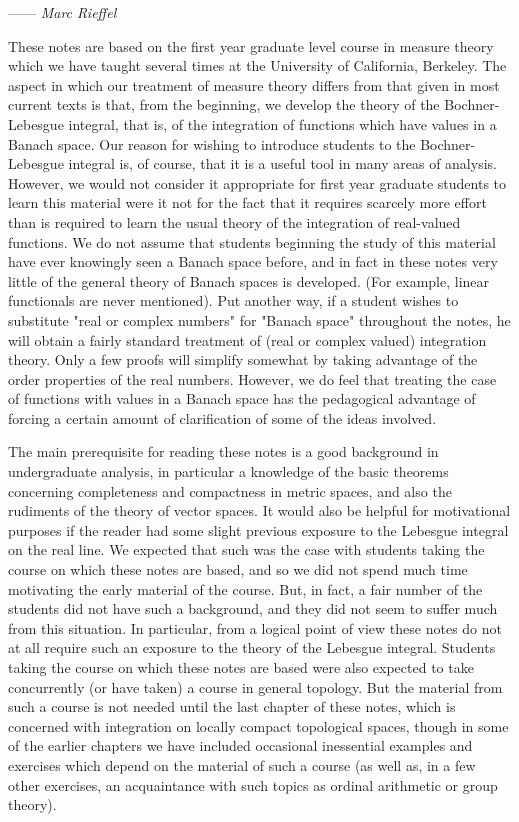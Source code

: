 
\hspace*{0pt}\hfill------ {\it Marc Rieffel}

These notes are based on the first year graduate level course in measure theory which we have taught several times at the University of California, Berkeley. The aspect in which our treatment of measure theory differs from that given in most current texts is that, from the beginning, we develop the theory of the Bochner-Lebesgue integral, that is, of the integration of functions which have values in a Banach space. Our reason for wishing to introduce students to the Bochner-Lebesgue integral is, of course, that it is a useful tool in many areas of analysis. However, we would not consider it appropriate for first year graduate students to learn this material were it not for the fact that it requires scarcely more effort than is required to learn the usual theory of the integration of real-valued functions. We do not assume that students beginning the study of this material have ever knowingly seen a Banach space before, and in fact in these notes very little of the general theory of Banach spaces is developed. (For example, linear functionals are never mentioned). Put another way, if a student wishes to substitute "real or complex numbers" for "Banach space" throughout the notes, he will obtain a fairly standard treatment of (real or complex valued) integration theory. Only a few proofs will simplify somewhat by taking advantage of the order properties of the real numbers. However, we do feel that treating the case of functions with values in a Banach space has the pedagogical advantage of forcing a certain amount of clarification of some of the ideas involved.

The main prerequisite for reading these notes is a good background in undergraduate analysis, in particular a knowledge of the basic theorems concerning completeness and compactness in metric spaces, and also the rudiments of the theory of vector spaces. It would also be helpful for motivational purposes if the reader had some slight previous exposure to the Lebesgue integral on the real line. We expected that such was the case with students taking the course on which these notes are based, and so we did not spend much time motivating the early material of the course. But, in fact, a fair number of the students did not have such a background, and they did not seem to suffer much from this situation. In particular, from a logical point of view these notes do not at all require such an exposure to the theory of the Lebesgue integral. Students taking the course on which these notes are based were also expected to take concurrently (or have taken) a course in general topology. But the material from such a course is not needed until the last chapter of these notes, which is concerned with integration on locally compact topological spaces, though in some of the earlier chapters we have included occasional inessential examples and exercises which depend on the material of such a course (as well as, in a few other exercises, an acquaintance with such topics as ordinal arithmetic or group theory).

